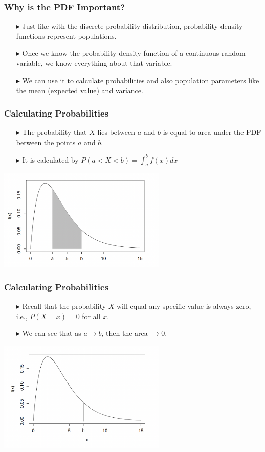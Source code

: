\documentclass[12pt]{beamer}
\begin{document}
\begin{frame}
	\frametitle{Why is the PDF Important?}
	\begin{itemize}
		\item[\color{blue}$\blacktriangleright$] Just like with the discrete probability distribution, probability density functions represent populations.
		\item[\color{blue}$\blacktriangleright$] Once we know the probability density function of a continuous random variable, we know everything about that variable.
		\item[\color{blue}$\blacktriangleright$] We can use it to calculate probabilities and also population parameters like the mean (expected value) and variance.
	\end{itemize}
	
\end{frame}
\begin{frame}
	\frametitle{Calculating Probabilities}
	\begin{itemize}
		\item[\color{blue}$\blacktriangleright$] The probability that $X$ lies between $a$ and $b$ is equal to area under the PDF between the points $a$ and $b$.
		\item[\color{blue}$\blacktriangleright$] It is calculated by $P(a<X<b)=\int_{a}^{b}f(x)dx$
	\end{itemize}
\centering
\includegraphics[width=8cm]{pdf3.png}
\end{frame}
\begin{frame}
	\frametitle{Calculating Probabilities}
	\begin{itemize}
		\item[\color{blue}$\blacktriangleright$] Recall that the probability $X$ will equal any specific value is always zero, i.e., $P(X=x)=0$ for all $x$.
		\item[\color{blue}$\blacktriangleright$] We can see that as $a\rightarrow b$, then the area $\rightarrow0$.
	\end{itemize}
	\centering
	\includegraphics[width=8cm]{pdf4.png}
\end{frame}
\end{document}
